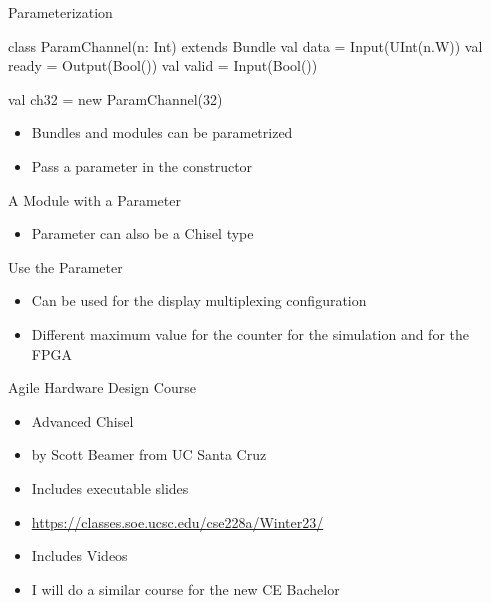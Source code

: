 \begin{frame}[fragile]{Parameterization}
\begin{chisel}
class ParamChannel(n: Int) extends Bundle {
  val data = Input(UInt(n.W))
  val ready = Output(Bool())
  val valid = Input(Bool())
}

val ch32 = new ParamChannel(32)
\end{chisel}
\begin{itemize}
\item Bundles and modules can be parametrized
\item Pass a parameter in the constructor
\end{itemize}

\end{frame}
\begin{frame}[fragile]{A Module with a Parameter}
\begin{itemize}
\item Parameter can also be a Chisel type
\end{itemize}
\end{frame}

\begin{frame}[fragile]{Use the Parameter}
\begin{itemize}
\item Can be used for the display multiplexing configuration
\item Different maximum value for the counter for the simulation and for the FPGA
\end{itemize}
\end{frame}

\begin{frame}[fragile]{Agile Hardware Design Course}
\begin{itemize}
\item Advanced Chisel
\item by Scott Beamer from UC Santa Cruz
\item Includes executable slides
\item \url{https://classes.soe.ucsc.edu/cse228a/Winter23/}
\item Includes Videos
\item I will do a similar course for the new CE Bachelor
\end{itemize}
\end{frame}

